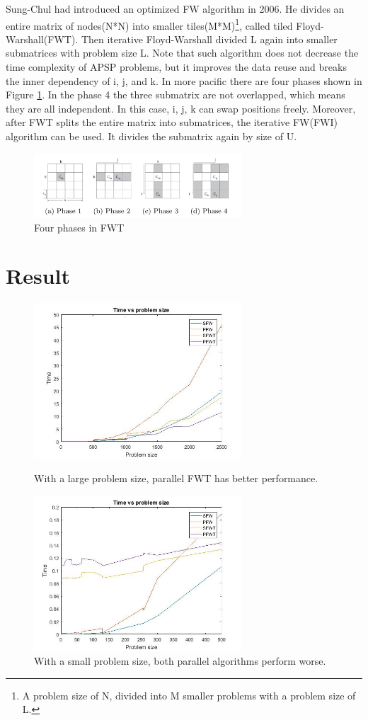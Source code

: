 \documentclass[10pt]{article}
\begin{document}
Sung-Chul had introduced an optimized FW algorithm in 2006\cite{Han:2006:PGA:1152154.1152189}. He divides an entire matrix of nodes(N*N) into smaller tiles(M*M)\footnote{A problem size of N, divided into M smaller problems with a problem size of L.}, called tiled Floyd-Warshall(FWT). Then iterative Floyd-Warshall divided L again into smaller  submatrices with problem size L. Note that such algorithm does not decrease the time complexity of APSP problems, but it improves the data reuse and breaks the inner dependency of i, j, and k. In more pacific there are four phases shown in Figure \ref{fig:phases}. In the phase 4 the three submatrix are not overlapped, which means they are all independent. In this case, i, j, k can swap positions freely. Moreover, after FWT splits the entire matrix into submatrices, the iterative FW(FWI) algorithm  can be used. It divides the submatrix again by size of U.
\begin{figure}
\includegraphics[width=3.05in]{FWT_phases}
	\caption{Four phases in FWT\cite{Han:2006:PGA:1152154.1152189}}
  \label{fig:phases}
\end{figure}


\section{Result}

\begin{figure}
	\includegraphics[width=3.05in]{plotL}
		\caption{With a large problem size, parallel FWT has better performance.}
		\label{fig:plotL}
	\includegraphics[width=3.05in]{plotS}
		\caption{With a small problem size, both parallel algorithms perform worse.}
		\label{fig:plotS}
\end{figure}
\end{document}
